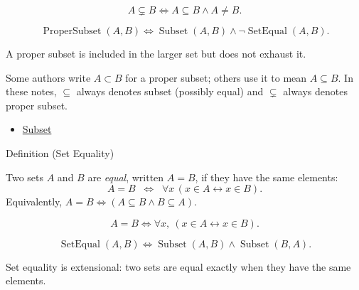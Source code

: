 \begin{remark*}
\[
  A\subsetneq B
  \iff
  A\subseteq B \wedge A\neq B.
\]
\end{remark*}

\begin{remark*}
\[
  \operatorname{ProperSubset}(A,B)
  \iff
  \operatorname{Subset}(A,B)\wedge \neg\operatorname{SetEqual}(A,B).
\]
\end{remark*}

\begin{remark*}[Interpretation]
A proper subset is included in the larger set but does not exhaust it.
\end{remark*}

\begin{remark*}[Exposition]
Some authors write $A \subset B$ for a proper subset; others use it to mean
$A \subseteq B$. In these notes, $\subseteq$ always denotes subset (possibly
equal) and $\subsetneq$ always denotes proper subset.
\end{remark*}

\begin{dependencies}
\begin{itemize}
  \item \hyperref[def:subset]{Subset}
\end{itemize}
\end{dependencies}

\begin{definitionbox}{Definition (Set Equality)}
\begin{definition}\label{def:set-equality}
Two sets $A$ and $B$ are \emph{equal}, written $A = B$, if they have the same
elements:
\[
A = B \;\;\Longleftrightarrow\;\; \forall x \, (x \in A \leftrightarrow x \in B).
\]
Equivalently, $A = B \iff (A \subseteq B \land B \subseteq A)$.
\end{definition}
\end{definitionbox}

\begin{remark*}
\[
  A=B
  \iff
  \forall x,\ (x\in A\leftrightarrow x\in B).
\]
\end{remark*}

\begin{remark*}
\[
  \operatorname{SetEqual}(A,B)
  \iff
  \operatorname{Subset}(A,B)\wedge \operatorname{Subset}(B,A).
\]
\end{remark*}

\begin{remark*}[Interpretation]
Set equality is extensional: two sets are equal exactly when they have the
same elements.
\end{remark*}

